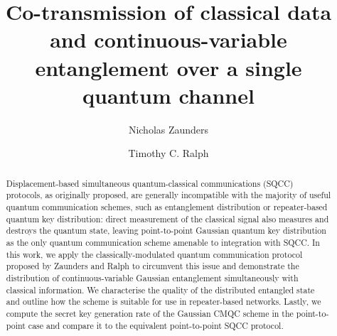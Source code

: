 \documentclass[%
 reprint,
 superscriptaddress,
 amsmath,
 amssymb,
 aps,
 pra,
]{revtex4-2}
\begin{document}

\title{Co-transmission of classical data and continuous-variable entanglement over a single quantum channel}

\author{Nicholas Zaunders} 

\author{Timothy C. Ralph}

\begin{abstract}
Displacement-based simultaneous quantum-classical communications (SQCC) protocols, as originally proposed, are generally incompatible with the majority of useful quantum communication schemes, such as entanglement distribution or repeater-based quantum key distribution: direct measurement of the classical signal also measures and destroys the quantum state, leaving point-to-point Gaussian quantum key distribution as the only quantum communication scheme amenable to integration with SQCC. In this work, we apply the classically-modulated quantum communication protocol proposed by Zaunders and Ralph \cite{zaunders_generalised_2026} to circumvent this issue and demonstrate the distribution of continuous-variable Gaussian entanglement simultaneously with classical information. We characterise the quality of the distributed entangled state and outline how the scheme is suitable for use in repeater-based networks. Lastly, we compute the secret key generation rate of the Gaussian CMQC scheme in the point-to-point case and compare it to the equivalent point-to-point SQCC protocol.
\end{abstract}

\maketitle
\end{document}
